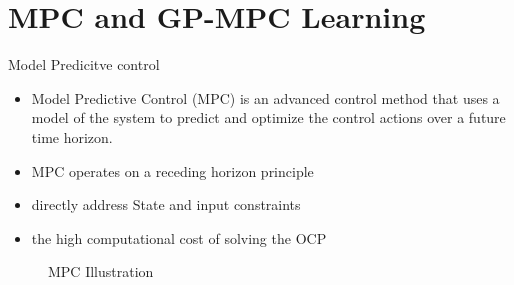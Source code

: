 \section{MPC and GP-MPC Learning}

\begin{frame}{Model Predicitve control}
    \begin{itemize}
        \item Model Predictive Control (MPC) is an advanced control method that uses a model of the system to predict and optimize the control actions over a future time horizon.
        \item MPC operates on a receding horizon principle 
        \item directly address State and input constraints
        \item the high computational cost of solving the OCP

        
    \end{itemize}
     \begin{figure}[ht]		%
        \centering
        \caption{MPC Illustration\cite{maiworm2021gaussian}}
        \label{f:figure_mpc}
    \end{figure}
\end{frame}









